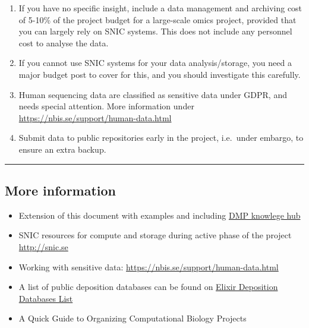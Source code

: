 \documentclass[10pt,a4paper,]{article}
\providecommand{\tightlist}{%
  \setlength{\itemsep}{0pt}\setlength{\parskip}{0pt}}
\begin{document}
\begin{enumerate}
\def\labelenumi{\arabic{enumi}.}
\tightlist
\item
  If you have no specific insight, include a data management and
  archiving cost of 5-10\% of the project budget for a large-scale omics
  project, provided that you can largely rely on SNIC systems. This does
  not include any personnel cost to analyse the data.
\item
  If you cannot use SNIC systems for your data analysis/storage, you
  need a major budget post to cover for this, and you should investigate
  this carefully.
\item
  Human sequencing data are classified as sensitive data under GDPR, and
  needs special attention. More information under
  \url{https://nbis.se/support/human-data.html}
\item
  Submit data to public repositories early in the project, i.e.~under
  embargo, to ensure an extra backup.
\end{enumerate}

\begin{center}\rule{0.5\linewidth}{\linethickness}\end{center}

\subsection{More information}\label{more-information}

\begin{itemize}
\tightlist
\item
  Extension of this document with examples and including
  \href{https://docs.google.com/document/d/1g6vJNIrkSnylASkNHB9Zwm5N6jvTgoSxBjS_bexRPsY/edit\#heading=h.wvltu9dpdsqz}{DMP
  knowlege hub}
\item
  SNIC resources for compute and storage during active phase of the
  project \url{http://snic.se}
\item
  Working with sensitive data:
  \url{https://nbis.se/support/human-data.html}
\item
  A list of public deposition databases can be found on
  \href{https://www.elixir-europe.org/platforms/data/elixir-deposition-databases}{Elixir
  Deposition Databases List}
\item
  A Quick Guide to Organizing Computational Biology Projects
  \citep{Noble2009} 
\end{itemize}


\end{document}

